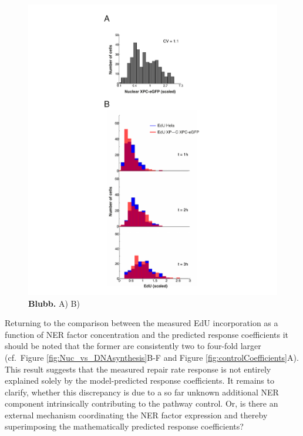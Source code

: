 \begin{figure}[htbp]
	\begin{center}
		\includegraphics[width=1\textwidth]{Abbildungen/figure3_4.pdf}
		\caption{\textbf{Blubb.} A) B) }
		\label{fig:consistVariability}
	\end{center}
\end{figure}



Returning to the comparison between the measured EdU incorporation as a function of NER factor concentration and the predicted response coefficients it should be noted that the  former are consistently two to four-fold larger (cf.\ Figure \ref{fig:Nuc_vs_DNAsynthesis}B-F and Figure \ref{fig:controlCoefficients}A). This result suggests that the measured repair rate response is not entirely explained solely by the model-predicted response coefficients. It remains to clarify, whether this discrepancy is due to a so far unknown additional NER component intrinsically contributing to the pathway control. Or, is there an external mechanism coordinating the NER factor expression and thereby superimposing the mathematically predicted response coefficients?

